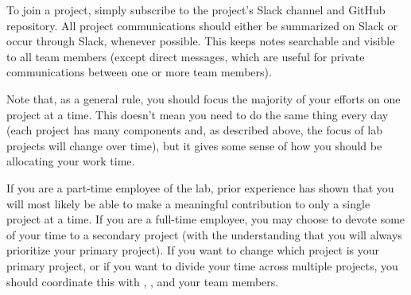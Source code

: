 \documentclass{tufte-book} %
\begin{document}
{}

\noindent To join a project, simply subscribe to the project's Slack channel and
GitHub repository.  All project communications should either be
summarized on Slack or occur through Slack, whenever possible.  This
keeps notes searchable and visible to all team members (except direct
messages, which are useful for private communications between one or
more team members).

Note that, as a general rule, you should focus the majority of your
efforts on one project at a time.  This doesn't mean you need to do
the same thing every day (each project has many components and, as
described above, the focus of lab projects will change over time), but
it gives some sense of how you should be allocating your work time.

If you are a part-time employee of the lab, prior experience has shown
that you will most likely be able to make a meaningful contribution to
only a single project at a time.  If you are a full-time employee, you
may choose to devote some of your time to a secondary project (with
the understanding that you will always prioritize your primary
project).  If you want to change which project is your primary
project, or if you want to divide your time across multiple projects,
you should coordinate this with \director, \coordinator, and your team
members.


\label{sec: scheduling}
\end{document}
